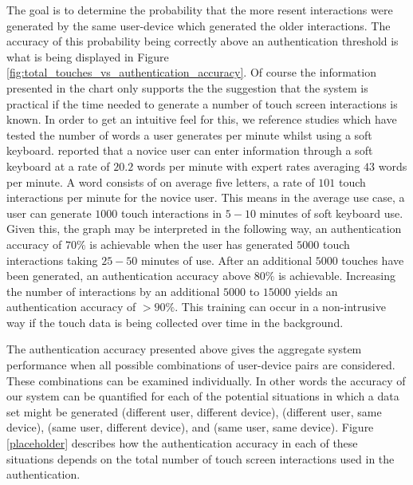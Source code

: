 %
%
The goal is to determine the probability that
the more resent interactions
were generated by the same user-device which
generated the older interactions.
%
The accuracy of this probability
being correctly above an authentication threshold 
is what is being displayed in 
Figure 
\ref{fig:total_touches_vs_authentication_accuracy}.
%
Of course
the information presented in the chart 
only supports the
the suggestion that the system is practical 
if the time needed to generate a number of
touch screen interactions is known.
%
In order to get an intuitive feel for this,
we reference studies which have tested
the number of words a user generates per minute
whilst using a soft keyboard.
%
\cite{mackenzie1999text} reported that a
novice user can enter information through 
a soft keyboard at a rate of $20.2$ words per minute with
expert rates averaging $43$ words per minute.
%
A word consists of on average five letters, 
a rate of $101$ touch interactions per minute for the novice user.
%
This means in the average use case, 
a user can generate $1000$ touch interactions in $5-10$ minutes of 
soft keyboard use.
%
Given this,
the graph may be interpreted in the following way,
an authentication accuracy of $70\%$ is achievable 
when the user has generated $5000$ touch interactions
taking $25-50$ minutes of use.
%
After an additional $5000$ touches have been generated,
an authentication accuracy above $80\%$ is achievable.
Increasing the number of interactions 
by an additional $5000$ to $15000$ yields
an authentication accuracy of $>90\%$.
%
This training can occur in a non-intrusive way
if the touch data is being collected over time in the background.


The authentication accuracy presented above gives 
the aggregate system performance when all
possible combinations of user-device pairs are considered.
These combinations can be examined individually.
%
In other words the accuracy of our system can be quantified
for each of the potential situations in which
a data set might be generated
(different user, different device),
(different user, same device),
(same user, different device), and
(same user, same device).
%
Figure \ref{placeholder} %
describes
how the authentication accuracy 
in each of these situations
depends on the total number of touch screen interactions
used in the authentication.

